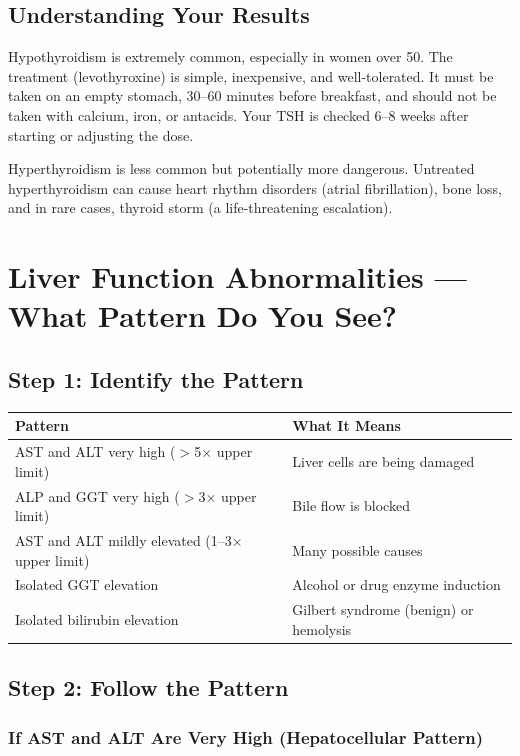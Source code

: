\subsection{Understanding Your Results}

Hypothyroidism is extremely common, especially in women over 50. The treatment (levothyroxine) is simple, inexpensive, and well-tolerated. It must be taken on an empty stomach, 30--60 minutes before breakfast, and should not be taken with calcium, iron, or antacids. Your TSH is checked 6--8 weeks after starting or adjusting the dose.

Hyperthyroidism is less common but potentially more dangerous. Untreated hyperthyroidism can cause heart rhythm disorders (atrial fibrillation), bone loss, and in rare cases, thyroid storm (a life-threatening escalation).

\clearpage
\section{Liver Function Abnormalities --- What Pattern Do You See?}

\subsection{Step 1: Identify the Pattern}

\begin{longtable}{@{}p{4.5cm}p{10.5cm}@{}}
\toprule
\textbf{Pattern} & \textbf{What It Means} \\
\midrule
AST and ALT very high ($>$5$\times$ upper limit) & Liver cells are being damaged \\
ALP and GGT very high ($>$3$\times$ upper limit) & Bile flow is blocked \\
AST and ALT mildly elevated (1--3$\times$ upper limit) & Many possible causes \\
Isolated GGT elevation & Alcohol or drug enzyme induction \\
Isolated bilirubin elevation & Gilbert syndrome (benign) or hemolysis \\
\bottomrule
\end{longtable}

\subsection{Step 2: Follow the Pattern}

\subsubsection{If AST and ALT Are Very High (Hepatocellular Pattern)}

